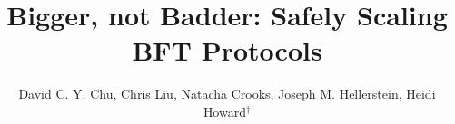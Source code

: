 \documentclass[sigplan,review]{acmart}
\begin{document}
\title{Bigger, not Badder: Safely Scaling BFT Protocols}

\author{David C. Y. Chu, Chris Liu, Natacha Crooks, Joseph M. Hellerstein, Heidi Howard$^\dagger$}






\maketitle










{\footnotesize

}
\end{document}
